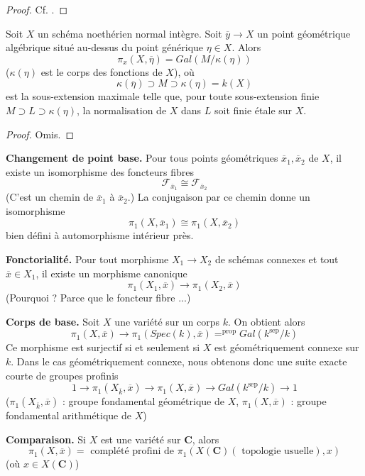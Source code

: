 \begin{proof}
Cf. \cite{SGA1}.
\end{proof}

\begin{proposition}
\label{proposition-integral-normal-fundamental-group}
Soit $X$ un schéma noethérien normal intègre. Soit
$\overline y\to X$ un point géométrique algébrique situé
au-dessus du point générique $\eta\in X$. Alors
$$
\pi_x(X, \overline \eta) = Gal(M/\kappa(\eta))
$$
($\kappa(\eta)$ est le corps des fonctions de $X$), où
$$
\kappa(\overline \eta)\supset M\supset \kappa(\eta) = k(X)
$$
est la sous-extension maximale telle que, pour toute sous-extension finie
$M\supset L\supset \kappa(\eta)$, la normalisation de $X$ dans $L$ soit finie
\'etale sur $X$.
\end{proposition}

\begin{proof}
Omis.
\end{proof}

\noindent
{\bf Changement de point base.} Pour tous points géométriques $\overline{x}_1, \overline{x}_2$
de $X$, il existe un isomorphisme des foncteurs fibres
$$
\mathcal{F}_{\overline{x}_1} \cong \mathcal{F}_{\overline{x}_2}
$$
(C'est un chemin de $\overline{x}_1$ à $\overline{x}_2$.) La conjugaison
par ce chemin donne un isomorphisme
$$
\pi_1(X, \overline{x}_1) \cong \pi_1(X, \overline{x}_2)
$$
bien défini à automorphisme intérieur près.

\medskip\noindent
{\bf Fonctorialité.} Pour tout morphisme $X_1\to X_2$ de schémas connexes
et tout $\overline{x}\in X_1$, il existe un morphisme canonique
$$
\pi_1(X_1, \overline{x}) \to \pi_1(X_2, \overline{x})
$$
(Pourquoi ? Parce que le foncteur fibre ...)

\medskip\noindent
{\bf Corps de base.} Soit $X$ une variété sur un corps $k$. On obtient alors
$$
\pi_1(X, \overline{x}) \to
\pi_1(Spec(k), \overline{x}) =^{\text{prop}} Gal(k^{\text{sep}}/k)
$$
Ce morphisme est surjectif si et seulement si $X$ est géométriquement connexe sur $k$.
Dans le cas géométriquement connexe, nous obtenons donc une suite exacte courte de groupes
profinis
$$
1 \to \pi_1(X_{\overline{k}}, \overline{x}) \to
\pi_1(X, \overline{x}) \to
Gal(k^{\text{sep}}/k) \to 1
$$
($\pi_1(X_{\overline{k}}, \overline{x})$ : groupe fondamental géométrique de
$X$, $\pi_1(X, \overline{x})$ : groupe fondamental arithmétique de $X$)

\medskip\noindent
{\bf Comparaison.} Si $X$ est une variété sur $\mathbf{C}$, alors
$$
\pi_1(X, \overline{x}) =
\text{ complété profini de }
\pi_1(X(\mathbf{C})(\text{ topologie usuelle}), x)
$$
(où $x\in X(\mathbf{C})$)

